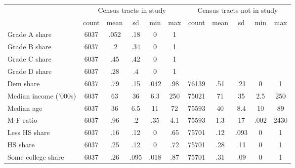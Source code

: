 {
\def\sym#1{\ifmmode^{#1}\else\(^{#1}\)\fi}
\begin{tabular}{l*{2}{ccccc}}
\toprule
                    &\multicolumn{5}{c}{Census tracts in study}                      &\multicolumn{5}{c}{Census tracts not in study}                  \\
                    &       count&        mean&          sd&         min&         max&       count&        mean&          sd&         min&         max\\
\midrule
Grade A share       &        6037&        .052&         .18&           0&           1&            &            &            &            &            \\
Grade B share       &        6037&          .2&         .34&           0&           1&            &            &            &            &            \\
Grade C share       &        6037&         .45&         .42&           0&           1&            &            &            &            &            \\
Grade D share       &        6037&         .28&          .4&           0&           1&            &            &            &            &            \\
Dem share           &        6037&         .79&         .15&        .042&         .98&       76139&         .51&         .21&           0&           1\\
Median income ('000s)&        6037&          63&          36&         6.3&         250&       75021&          71&          35&         2.5&         250\\
Median age          &        6037&          36&         6.5&          11&          72&       75593&          40&         8.4&          10&          89\\
M-F ratio           &        6037&         .96&          .2&         .35&         4.1&       75593&         1.3&          17&        .002&        2430\\
Less HS share       &        6037&         .16&         .12&           0&         .65&       75701&         .12&        .093&           0&           1\\
HS share            &        6037&         .25&         .12&           0&         .72&       75701&         .28&         .11&           0&           1\\
Some college share  &        6037&         .26&        .095&        .018&         .87&       75701&         .31&         .09&           0&           1\\

\end{tabular}}
